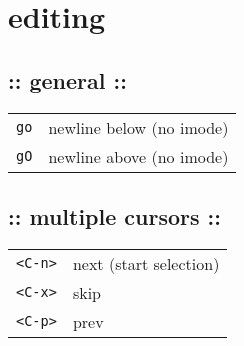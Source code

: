 \section{\hrulefill editing\hrulefill}
\subsection{:: general ::}
\begin{tabular}{@{}ll@{}}
    \verb!go!       & newline below (no imode) \\
    \verb!gO!       & newline above (no imode) \\
\end{tabular}

\subsection{:: multiple cursors ::}
\begin{tabular}{@{}ll@{}}
    \verb!<C-n>!    & next (start selection) \\
    \verb!<C-x>!    & skip \\
    \verb!<C-p>!    & prev \\
\end{tabular}
